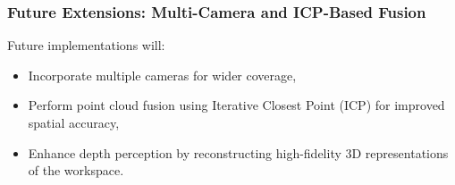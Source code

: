 \subsubsection{Future Extensions: Multi-Camera and ICP-Based Fusion}
Future implementations will:
\begin{itemize}
    \item Incorporate multiple cameras for wider coverage,
    \item Perform point cloud fusion using Iterative Closest Point (ICP) for improved spatial accuracy,
    \item Enhance depth perception by reconstructing high-fidelity 3D representations of the workspace.
\end{itemize}

